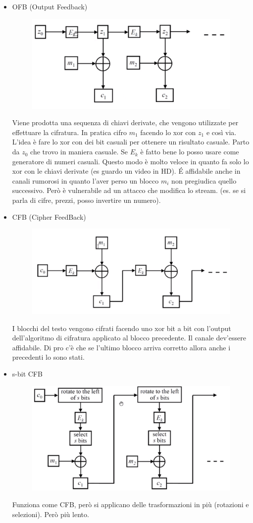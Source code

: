 \begin{itemize}
\begin{itemize}
\item OFB (Output Feedback)\\
\begin{figure}[h]
	\centering
	\includegraphics[width=0.5\linewidth]{immagini/img39}
\end{figure}
Viene prodotta una sequenza di chiavi derivate, che vengono utilizzate per effettuare la cifratura. In pratica cifro $m_1$ facendo lo xor con $z_1$ e così via. L'idea è fare lo xor con dei bit casuali per ottenere un risultato casuale. Parto da $z_0$ che trovo in maniera casuale. Se $E_k$ è fatto bene lo posso usare come generatore di numeri casuali.
Questo modo è molto veloce in quanto fa solo lo xor con le chiavi derivate (es guardo un video in HD). \'E affidabile anche in canali rumorosi in quanto l'aver perso un blocco $m_i$ non pregiudica quello successivo. Però è vulnerabile ad un attacco che modifica lo stream. (es. se si parla di cifre, prezzi, posso invertire un numero).
\item CFB (Cipher FeedBack)\\
\begin{figure}[h]
	\centering
	\includegraphics[width=0.5\linewidth]{immagini/img40}
\end{figure}
I blocchi del testo vengono cifrati facendo uno xor bit a bit con l'output dell'algoritmo di cifratura applicato al blocco precedente. Il canale dev'essere affidabile. Di pro c'è che se l'ultimo blocco arriva corretto allora anche i precedenti lo sono stati.

\newpage
\item s-bit CFB\\
\begin{figure}[h]
	\centering
	\includegraphics[width=0.5\linewidth]{immagini/img41}
\end{figure}
Funziona come CFB, però si applicano delle trasformazioni in più (rotazioni e selezioni). Però più lento.


\end{itemize}
\end{itemize}
